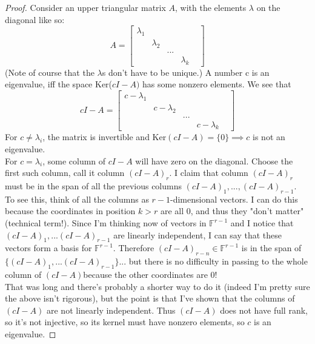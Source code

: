 \documentclass[12pt]{amsart}
\newenvironment{problem}[2][Problem]{\begin{trivlist}
\item[\hskip \labelsep {\bfseries #1}\hskip \labelsep {\bfseries #2.}]}{\end{trivlist}}
\begin{document}
\begin{problem}{6}
\begin{proof}
Consider an upper triangular matrix $A$, with the elements $\lambda$ on the diagonal like so:
$$
A = \begin{bmatrix}
\lambda_1 & & \\
& \lambda_2 & \\
& & ... & & \\
& & & \lambda_k
\end{bmatrix}
$$
(Note of course that the $\lambda$s don't have to be unique.) A number c is an eigenvalue, iff the space Ker($cI - A)$ has some nonzero elements. We see that
$$
cI - A = \begin{bmatrix}
c - \lambda_1 & & \\
& c - \lambda_2 & \\
& & ... & & \\
& & & c - \lambda_k
\end{bmatrix}
$$
For $c \neq \lambda_i$, the matrix is invertible and Ker$(cI - A) = \{0\} \implies c$ is not an eigenvalue. \\
For $c = \lambda_i$, some column of $cI -A$ will have zero on the diagonal. Choose the first such column, call it column $(cI-A)_r$. I claim that column $(cI-A)_r$ must be in the span of all the previous columns $(cI-A)_1,...,(cI-A)_{r-1}$.  \\
To see this, think of all the columns as $r-1$-dimensional vectors. I can do this because the coordinates in position $k>r$ are all 0, and thus they "don't matter" (technical term!). Since I'm thinking now of vectors in $\mathbb{F}^{r-1}$ and I notice that $(cI-A)_1, ... (cI-A)_{r-1}$ are linearly independent, I can say that these vectors form a basis for  $\mathbb{F}^{r-1}$. Therefore $(cI-A)_{r-n} \in \mathbb{F}^{r-1}$ is in the span of $ \{ (cI-A)_1, ... (cI-A)_{r-1} \}$... but there is no difficulty in passing to the whole column of $(cI-A)$because the other coordinates are 0! \\
That was long and there's probably a shorter way to do it (indeed I'm pretty sure the above isn't rigorous), but the point is that I've shown that the columns of $(cI-A)$ are not linearly independent. Thus $(cI-A)$ does not have full rank, so it's not injective, so its kernel must have nonzero elements, so $c$ is an eigenvalue.
\end{proof}
\end{problem}
\end{document}

